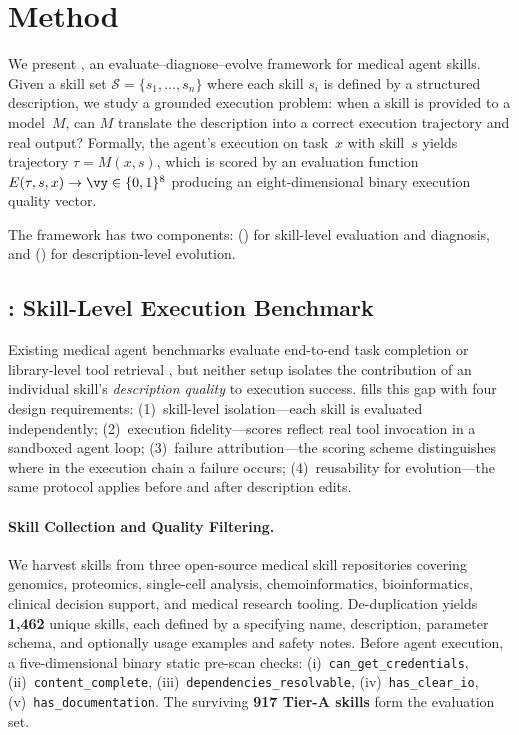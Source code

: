 
\section{Method}
\label{sec:method}

We present \medskille, an evaluate--diagnose--evolve framework for medical agent skills.
Given a skill set $\mathcal{S}=\{s_1,\dots,s_n\}$ where each skill $s_i$ is defined by a structured \skillmd description, we study a grounded execution problem: when a skill is provided to a model~$M$, can $M$ translate the description into a correct execution trajectory and real output?
Formally, the agent's execution on task~$x$ with skill~$s$ yields trajectory $\tau = M(x, s)$, which is scored by an evaluation function $E(\tau, s, x) \rightarrow \vy \in \{0,1\}^8$ producing an eight-dimensional binary execution quality vector.

The framework has two components: \medskillbench () for skill-level evaluation and diagnosis, and \gepamed () for description-level evolution.


\subsection{\medskillbench: Skill-Level Execution Benchmark}
\label{subsec:bench}

Existing medical agent benchmarks evaluate end-to-end task completion \citep{healthbench2025,medagentbench2025} or library-level tool retrieval \citep{skillsbench2026,skillnet2026}, but neither setup isolates the contribution of an individual skill's \emph{description quality} to execution success.
\medskillbench fills this gap with four design requirements:
(1)~skill-level isolation---each skill is evaluated independently;
(2)~execution fidelity---scores reflect real tool invocation in a sandboxed agent loop;
(3)~failure attribution---the scoring scheme distinguishes where in the execution chain a failure occurs;
(4)~reusability for evolution---the same protocol applies before and after description edits.

\paragraph{Skill Collection and Quality Filtering.}
We harvest skills from three open-source medical skill repositories covering genomics, proteomics, single-cell analysis, chemoinformatics, bioinformatics, clinical decision support, and medical research tooling.
De-duplication yields \textbf{1,462} unique skills, each defined by a \skillmd specifying name, description, parameter schema, and optionally usage examples and safety notes.
Before agent execution, a five-dimensional binary static pre-scan checks:
(i)~\texttt{can\_get\_credentials},
(ii)~\texttt{content\_complete},
(iii)~\texttt{dependencies\_resolvable},
(iv)~\texttt{has\_clear\_io},
(v)~\texttt{has\_documentation}.
The surviving \textbf{917 Tier-A skills} form the evaluation set.

